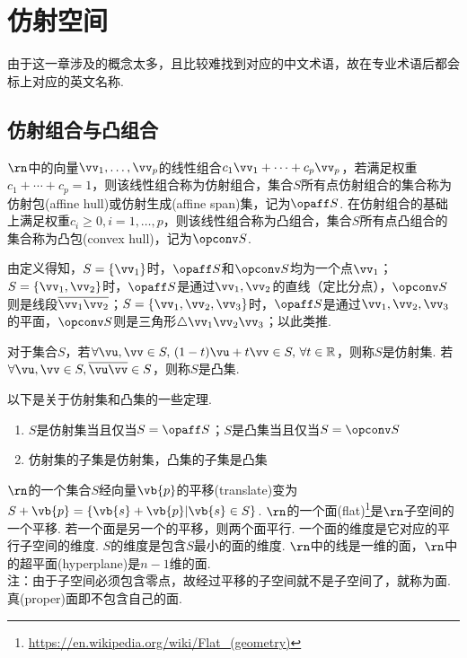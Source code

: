 
\section{仿射空间}
由于这一章涉及的概念太多，且比较难找到对应的中文术语，故在专业术语后都会标上对应的英文名称.
\subsection{仿射组合与凸组合}
\begin{definition}[仿射组合与凸组合]\rm
$\rn$中的向量$\vv_1,\dots,\vv_p$的线性组合$c_1\vv_1+\cdots+c_p\vv_p$，若满足权重$c_1+\cdots+c_p=1$，则该线性组合称为仿射组合，集合$S$所有点仿射组合的集合称为仿射包(affine hull)或仿射生成(affine span)集，记为$\opaff S$. 在仿射组合的基础上满足权重$c_i\geq 0,i=1,\dots,p$，则该线性组合称为凸组合，集合$S$所有点凸组合的集合称为凸包(convex hull)，记为$\opconv S$.
\end{definition}
由定义得知，$S=\{\vv_1\}$时，$\opaff S$和$\opconv S$均为一个点$\vv_1$；$S=\{\vv_1,\vv_2\}$时，$\opaff S$是通过$\vv_1,\vv_2$的直线（定比分点），$\opconv S$则是线段$\overline{\vv_1\vv_2}$；$S=\{\vv_1,\vv_2,\vv_3\}$时，$\opaff S$是通过$\vv_1,\vv_2,\vv_3$的平面，$\opconv S$则是三角形$\triangle\vv_1\vv_2\vv_3$；以此类推.
\begin{definition}
对于集合$S$，若$\forall\vu,\vv\in S,\,(1-t)\vu+t\vv\in S,\,\forall t\in\mathbb{R}$，则称$S$是仿射集. 若$\forall\vu,\vv\in S,\overline{\vu\vv}\in S$，则称$S$是凸集.
\end{definition}
\begin{theorem}以下是关于仿射集和凸集的一些定理.
\begin{enumerate}
	\itemsep -3pt
	\item $S$是仿射集当且仅当$S=\opaff S$；$S$是凸集当且仅当$S=\opconv S$
	\item 仿射集的子集是仿射集，凸集的子集是凸集
\end{enumerate}
\end{theorem}
\begin{definition}
\rm$\rn$的一个集合$S$经向量$\vb{p}$的平移(translate)变为$S+\vb{p}=\{\vb{s}+\vb{p}|\vb{s}\in S\}$. $\rn$的一个面(flat)\footnote{\url{https://en.wikipedia.org/wiki/Flat_(geometry)}}是$\rn$子空间的一个平移. 若一个面是另一个的平移，则两个面平行. 一个面的维度是它对应的平行子空间的维度. $S$的维度是包含$S$最小的面的维度. $\rn$中的线是一维的面，$\rn$中的超平面(hyperplane)是$n-1$维的面.\\
注：由于子空间必须包含零点，故经过平移的子空间就不是子空间了，就称为面. 真(proper)面即不包含自己的面.
\end{definition}
